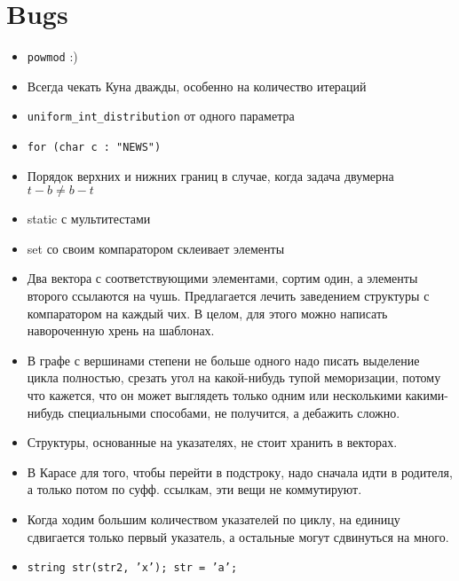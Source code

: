 \section{Bugs}

\begin{itemize}
	\item \texttt{powmod} :)

	\item Всегда чекать Куна дважды, особенно на количество итераций

	\item \texttt{uniform\_int\_distribution} от одного параметра

	\item \texttt{for (char c : "NEWS")}

	\item Порядок верхних и нижних границ в случае, когда задача двумерна
		$t - b \neq b - t$

	\item static с мультитестами

	\item set со своим компаратором склеивает элементы

	\item Два вектора с соответствующими элементами, сортим один, а элементы
		второго ссылаются на чушь. Предлагается лечить заведением структуры с
		компаратором на каждый чих. В целом, для этого можно написать навороченную
		хрень на шаблонах.

	\item В графе с вершинами степени не больше одного надо писать выделение
		цикла полностью, срезать угол на какой-нибудь тупой меморизации, потому
		что кажется, что он может выглядеть только одним или несколькими
		какими-нибудь специальными способами, не получится, а дебажить сложно.

	\item Структуры, основанные на указателях, не стоит хранить в векторах.

	\item В Карасе для того, чтобы перейти в подстроку, надо сначала идти в
		родителя, а только потом по суфф. ссылкам, эти вещи не коммутируют.

	\item Когда ходим большим количеством указателей по циклу, на единицу
		сдвигается только первый указатель, а остальные могут сдвинуться на много.

	\item \texttt{string str(str2, 'x'); str = 'a';}
\end{itemize}
